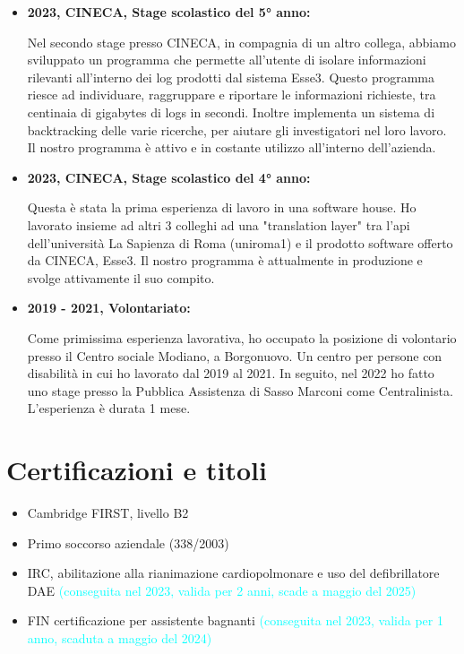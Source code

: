 \documentclass{paper}
\begin{document}
\begin{itemize}
    \item \textbf{2023, CINECA, Stage scolastico del 5° anno:}
    
    Nel secondo stage presso CINECA, in compagnia di un altro collega,
    abbiamo sviluppato un programma che permette all'utente di isolare
    informazioni rilevanti all'interno dei log prodotti dal sistema Esse3.
    Questo programma riesce ad individuare, raggruppare e riportare
    le informazioni richieste, tra centinaia di gigabytes di logs in secondi.
    Inoltre implementa un sistema di backtracking delle varie ricerche,
    per aiutare gli investigatori nel loro lavoro.
    Il nostro programma è attivo e in costante utilizzo all'interno dell'azienda.

    \item \textbf{2023, CINECA, Stage scolastico del 4° anno:}
    
    Questa è stata la prima esperienza di lavoro in una software house.
    Ho lavorato insieme ad altri 3 colleghi ad una "translation layer"
    tra l'api dell'università La Sapienza di Roma (uniroma1) e
    il prodotto software offerto da CINECA, Esse3. Il nostro programma
    è attualmente in produzione e svolge attivamente il suo compito.
    
    \item \textbf{2019 - 2021, Volontariato:}
    
    Come primissima esperienza lavorativa, ho occupato la posizione
    di volontario presso il Centro sociale Modiano, a Borgonuovo.
    Un centro per persone con disabilità in cui ho lavorato dal 2019 al 2021.
    In seguito, nel 2022 ho fatto uno stage presso la Pubblica Assistenza
    di Sasso Marconi come Centralinista. L'esperienza è durata 1 mese.
\end{itemize}

\section{Certificazioni e titoli}

\begin{itemize}
    \item Cambridge FIRST, livello B2
    
    \item Primo soccorso aziendale (338/2003)
    
    \item IRC, abilitazione alla rianimazione cardiopolmonare
    e uso del defibrillatore DAE \textcolor{cyan}{(conseguita
    nel 2023, valida per 2 anni, scade a maggio del 2025)}
    
    \item FIN certificazione per assistente bagnanti
    \textcolor{cyan}{(conseguita nel 2023, valida per
    1 anno, scaduta a maggio del 2024)}
\end{itemize}
\end{document}
